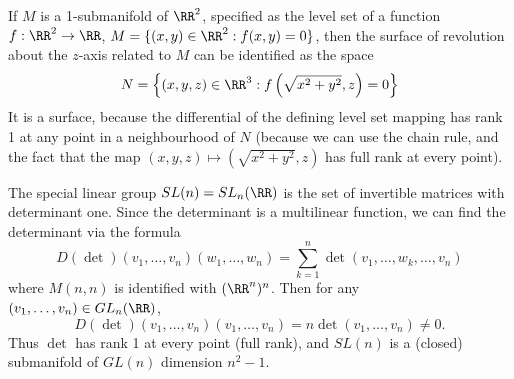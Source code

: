 \begin{example}
    If $M$ is a 1-submanifold of $\RR^2$, specified as the level set of a function $f: \RR^2 \to \RR$, $M = \{ (x,y) \in \RR^2: f(x,y) = 0 \}$, then the surface of revolution about the $z$-axis related to $M$ can be identified as the space
    \[ N = \left\{ (x,y,z) \in \RR^3: f \left( \sqrt{x^2 + y^2}, z \right) = 0 \right\} \]
    It is a surface, because the differential of the defining level set mapping has rank 1 at any point in a neighbourhood of $N$ (because we can use the chain rule, and the fact that the map $(x,y,z) \mapsto (\sqrt{x^2 + y^2}, z)$ has full rank at every point).
\end{example}

\begin{example}
    The special linear group $SL(n) = SL_n(\RR)$ is the set of invertible matrices with determinant one. Since the determinant is a multilinear function, we can find the determinant via the formula
    \[ D(\det)(v_1, \dots, v_n)(w_1, \dots, w_n) = \sum_{k = 1}^n \det(v_1, \dots, w_k, \dots, v_n) \]
    where $M(n,n)$ is identified with $(\RR^n)^n$. Then for any $(v_1, \dots, v_n) \in GL_n(\RR)$,
    \[ D(\det)(v_1, \dots, v_n)(v_1, \dots, v_n) = n \det(v_1, \dots, v_n) \neq 0. \]
    Thus $\det$ has rank 1 at every point (full rank), and $SL(n)$ is a (closed) submanifold of $GL(n)$ dimension $n^2 - 1$.
\end{example}

